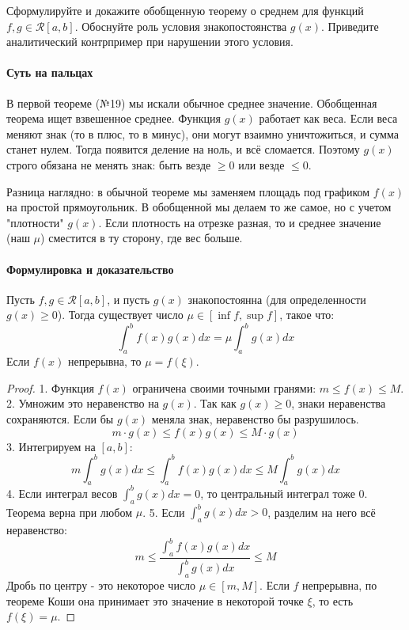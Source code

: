 {Сформулируйте и докажите обобщенную теорему о среднем для функций $f,g\in\mathcal{R}[a,b]$. Обоснуйте роль условия знакопостоянства $g(x)$. Приведите аналитический контрпример при нарушении этого условия.}

\paragraph{Суть на пальцах}
В первой теореме (№19) мы искали обычное среднее значение. Обобщенная теорема ищет взвешенное среднее. 
Функция $g(x)$ работает как веса. Если веса меняют знак (то в плюс, то в минус), они могут взаимно уничтожиться, и сумма станет нулем. 
Тогда появится деление на ноль, и всё сломается. Поэтому $g(x)$ строго обязана не менять знак: быть везде $\ge 0$ или везде $\le 0$.

Разница наглядно: в обычной теореме мы заменяем площадь под графиком $f(x)$ на простой прямоугольник. В обобщенной мы делаем то же самое, но с учетом "плотности" $g(x)$. Если плотность на отрезке разная, то и среднее значение (наш $\mu$) сместится в ту сторону, где вес больше.

\paragraph{Формулировка и доказательство}
Пусть $f, g \in \mathcal{R}[a, b]$, и пусть $g(x)$ знакопостоянна (для определенности $g(x) \ge 0$). Тогда существует число $\mu \in [\inf f, \sup f]$, такое что:
$$ \int_a^b f(x)g(x)dx = \mu \int_a^b g(x)dx $$
Если $f(x)$ непрерывна, то $\mu = f(\xi)$.

\begin{proof}
1. Функция $f(x)$ ограничена своими точными гранями: $m \le f(x) \le M$.
2. Умножим это неравенство на $g(x)$. Так как $g(x) \ge 0$, знаки неравенства сохраняются. Если бы $g(x)$ меняла знак, неравенство бы разрушилось.
$$ m \cdot g(x) \le f(x)g(x) \le M \cdot g(x) $$
3. Интегрируем на $[a, b]$:
$$ m \int_a^b g(x)dx \le \int_a^b f(x)g(x)dx \le M \int_a^b g(x)dx $$
4. Если интеграл весов $\int_a^b g(x)dx = 0$, то центральный интеграл тоже $0$. Теорема верна при любом $\mu$. 
5. Если $\int_a^b g(x)dx > 0$, разделим на него всё неравенство:
$$ m \le \frac{\int_a^b f(x)g(x)dx}{\int_a^b g(x)dx} \le M $$
Дробь по центру - это некоторое число $\mu \in [m, M]$. Если $f$ непрерывна, по теореме Коши она принимает это значение в некоторой точке $\xi$, то есть $f(\xi) = \mu$.
\end{proof}

